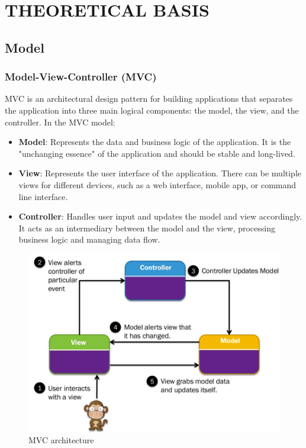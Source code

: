 \section{THEORETICAL BASIS}

\subsection{Model}

\subsubsection{Model-View-Controller (MVC)}

MVC is an architectural design pattern for building applications that separates the application into three main logical components: the model, the view, and the controller. In the MVC model:

\begin{itemize}
    \item \textbf{Model}: Represents the data and business logic of the application. It is the "unchanging essence" of the application and should be stable and long-lived.

    \item \textbf{View}: Represents the user interface of the application. There can be multiple views for different devices, such as a web interface, mobile app, or command line interface.

    \item \textbf{Controller}: Handles user input and updates the model and view accordingly. It acts as an intermediary between the model and the view, processing business logic and managing data flow.
\end{itemize}

\begin{figure}[H]
    \centering
    \includegraphics[width=\textwidth]{assets/images/Research/System/MVC.png}
    \caption{MVC architecture}
    \label{fig:mvc}
\end{figure}

